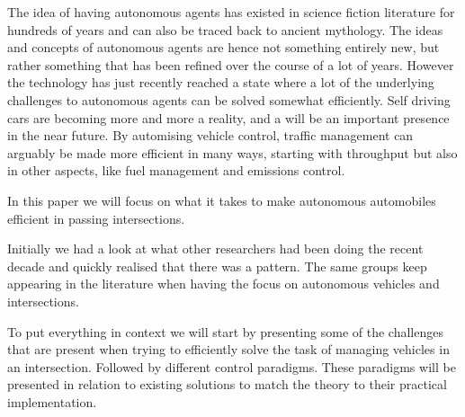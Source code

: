 
The idea of having autonomous agents has existed in science fiction literature for hundreds of years and can also be traced back to ancient mythology.
The ideas and concepts of autonomous agents are hence not something entirely new, but rather something that has been refined over the course of a lot of years.
However the technology has just recently reached a state where a lot of the underlying challenges to autonomous agents can be solved somewhat efficiently.
Self driving cars are becoming more and more a reality, and a will be an important presence in the near future.
By automising vehicle control, traffic management can arguably be made more efficient in many ways, starting with throughput but also in other aspects, like fuel management and emissions control. 

In this paper we will focus on what it takes to make autonomous automobiles efficient in passing intersections.

Initially we had a look at what other researchers had been doing the recent decade and quickly realised that there was a pattern. 
The same groups keep appearing in the literature when having the focus on autonomous vehicles and intersections.

To put everything in context we will start by presenting some of the challenges that are present when trying to efficiently solve the task of managing vehicles in an intersection.
Followed by different control paradigms. These paradigms will be presented in relation to existing solutions to match the theory to their practical implementation.
